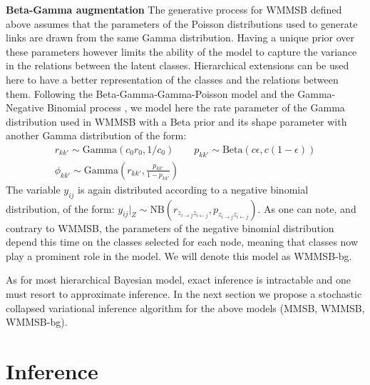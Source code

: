 \textbf{Beta-Gamma augmentation} The generative process for WMMSB defined above assumes that the parameters of the Poisson distributions used to generate links are drawn from the same Gamma distribution. Having a unique prior over these parameters however limits the ability of the model to capture the variance in the relations between the latent classes. Hierarchical extensions can be used here to have a better representation of the classes and the relations between them. Following the Beta-Gamma-Gamma-Poisson model \cite{zhou2012beta} and the Gamma-Negative Binomial process \cite{zhou2015negative}, we model here the rate parameter of the Gamma distribution used in WMMSB with a Beta prior and its shape parameter with another Gamma distribution of the form:
%
\begin{gather*}
r_{kk'} \sim \textrm{Gamma}(c_0r_0, 1/c_0) \qquad p_{kk'} \sim \textrm{Beta}(c\epsilon, c(1-\epsilon)) \\
\phi_{kk'} \sim \textrm{Gamma}(r_{kk'}, \frac{p_{kk'}}{1-p_{kk'}})
\end{gather*}
%
The variable $y_{ij}$ is again distributed according to a negative binomial distribution, of the form: $y_{ij}|_{Z} \sim \textrm{NB}(r_{z_{i \rightarrow j} z_{i \leftarrow j}},p_{z_{i \rightarrow j} z_{i \leftarrow j}})$. As one can note, and contrary to WMMSB, the parameters of the negative binomial distribution depend this time on the classes selected for each node, meaning that classes now play a prominent role in the model. We will denote this model as WMMSB-bg.

As for most hierarchical Bayesian model, exact inference is intractable and one must resort to approximate inference. In the next section we propose a stochastic collapsed variational inference algorithm for the above models (MMSB, WMMSB, WMMSB-bg).

\section{Inference}
\label{sec:inference}

